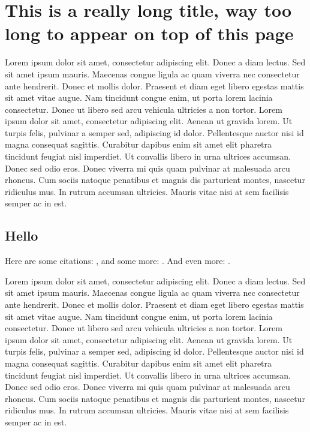 \chapter{This is a really long title, way too long to appear on top of this page}
\label{ch:long-chapter}

\begin{chapabstract}
  Lorem ipsum dolor sit amet, consectetur adipiscing elit. Donec a diam lectus.
  Sed sit amet ipsum mauris. Maecenas congue ligula ac quam viverra nec
  consectetur ante hendrerit. Donec et mollis dolor. Praesent et diam eget
  libero egestas mattis sit amet vitae augue. Nam tincidunt congue enim, ut
  porta lorem lacinia consectetur. Donec ut libero sed arcu vehicula ultricies a
  non tortor. Lorem ipsum dolor sit amet, consectetur adipiscing elit. Aenean ut
  gravida lorem. Ut turpis felis, pulvinar a semper sed, adipiscing id dolor.
  Pellentesque auctor nisi id magna consequat sagittis. Curabitur dapibus enim
  sit amet elit pharetra tincidunt feugiat nisl imperdiet. Ut convallis libero
  in urna ultrices accumsan. Donec sed odio eros. Donec viverra mi quis quam
  pulvinar at malesuada arcu rhoncus. Cum sociis natoque penatibus et magnis dis
  parturient montes, nascetur ridiculus mus. In rutrum accumsan ultricies.
  Mauris vitae nisi at sem facilisis semper ac in est.
\end{chapabstract}

\section{Hello}
\label{sec:ch1-hello}

Here are some citations:
\cite{Teunissen_thesis_2015,Teunissen_2014,Teunissen_2014b}, and some more:
\cite{Dubinova_2014,Nijdam_2014,Sun_2014,Sun_2013,Li_comparison_2012,Dhali_1985}.
And even more: \cite{Aleksandrov_1996,Allan_2006,Amestoy_2001}.

Lorem ipsum dolor sit amet, consectetur adipiscing elit. Donec a diam lectus.
Sed sit amet ipsum mauris. Maecenas congue ligula ac quam viverra nec
consectetur ante hendrerit. Donec et mollis dolor. Praesent et diam eget libero
egestas mattis sit amet vitae augue. Nam tincidunt congue enim, ut porta lorem
lacinia consectetur. Donec ut libero sed arcu vehicula ultricies a non tortor.
Lorem ipsum dolor sit amet, consectetur adipiscing elit. Aenean ut gravida
lorem. Ut turpis felis, pulvinar a semper sed, adipiscing id dolor. Pellentesque
auctor nisi id magna consequat sagittis. Curabitur dapibus enim sit amet elit
pharetra tincidunt feugiat nisl imperdiet. Ut convallis libero in urna ultrices
accumsan. Donec sed odio eros. Donec viverra mi quis quam pulvinar at malesuada
arcu rhoncus. Cum sociis natoque penatibus et magnis dis parturient montes,
nascetur ridiculus mus. In rutrum accumsan ultricies. Mauris vitae nisi at sem
facilisis semper ac in est.

